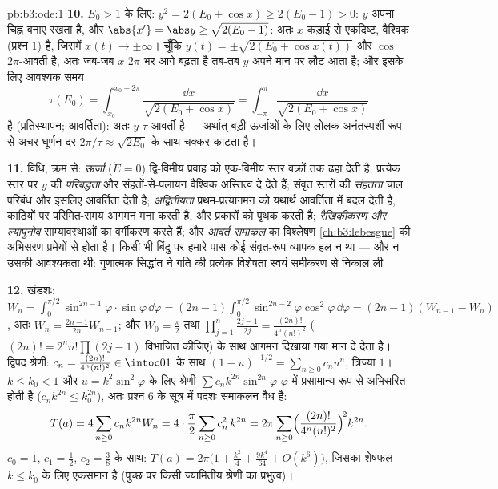 \begin{solution}{pb:b3:ode:1}
\textbf{10.} $E_0 > 1$ के लिए: $y^2 = 2(E_0 + \cos x) \geq
2(E_0 - 1) > 0$: $y$ अपना चिह्न बनाए रखता है, और
$\abs{x'} = \abs y
\geq \sqrt{2(E_0 - 1)}$: अतः $x$ कड़ाई से एकदिष्ट, वैश्विक (प्रश्न 1) है, जिसमें
$x(t) \to \pm\infty$। चूँकि $y(t) =
\pm\sqrt{2(E_0 + \cos x(t))}$ और $\cos$ $2\pi$-आवर्ती है, अतः जब-जब $x$ $2\pi$
भर आगे बढ़ता है तब-तब $y$ अपने मान पर लौट आता है; और इसके लिए
आवश्यक समय
\[
\tau(E_0) = \int_{x_0}^{x_0 + 2\pi}\frac{\dd
x}{\sqrt{2(E_0 + \cos x)}} =
\int_{-\pi}^{\pi}\frac{\dd x}{\sqrt{2(E_0 + \cos x)}}
\]
है (प्रतिस्थापन; आवर्तिता): अतः $y$ $\tau$-आवर्ती है --- अर्थात्
बड़ी ऊर्जाओं के लिए लोलक अनंतस्पर्शी रूप से अचर घूर्णन दर $2\pi/\tau \approx \sqrt{2E_0}$ के
साथ चक्कर काटता है।

\textbf{11.} विधि, क्रम से: \emph{ऊर्जा} ($\dot E =
0$) द्वि-विमीय प्रवाह
को एक-विमीय स्तर वक्रों तक ढहा देती है; प्रत्येक स्तर पर $y$ की
\emph{परिबद्धता} और संहतों-से-पलायन वैश्विक अस्तित्व दे देते हैं;
संवृत स्तरों की \emph{संहतता} चाल परिबंध और इसलिए आवर्तिता देती है;
\emph{अद्वितीयता} प्रथम-प्रत्यागमन को यथार्थ आवर्तिता में बदल देती
है, काठियों पर परिमित-समय आगमन मना करती है, और  प्रकारों को
पृथक करती है; \emph{रैखिकीकरण और ल्यापुनोव} साम्यावस्थाओं का वर्गीकरण
करते हैं; और \emph{आवर्त समाकल} का विश्लेषण \cref{ch:b3:lebesgue} की अभिसरण प्रमेयों
से होता है। किसी भी बिंदु पर हमारे पास कोई संवृत-रूप व्यापक हल न
था --- और न उसकी आवश्यकता थी: गुणात्मक सिद्धांत ने गति की प्रत्येक
विशेषता स्वयं समीकरण से निकाल ली।

\textbf{12.} खंडशः: $W_n = \int_0^{\pi/2}\sin^{2n-1}\varphi
\cdot\sin\varphi\,\dd\varphi = (2n-1)\int_0^{\pi/2}
\sin^{2n-2}\varphi\cos^2\varphi\,\dd\varphi = (2n-1)(W_{n-1}
- W_n)$, अतः $W_n = \frac{2n-1}{2n}W_{n-1}$; और $W_0 =
\frac\pi2$ तथा $\prod_{j=1}^n\frac{2j-1}{2j} =
\frac{(2n)!}{4^n(n!)^2}$ ($(2n)! = 2^nn!\prod(2j-1)$
विभाजित कीजिए) के साथ आगमन दिखाया गया मान दे देता है। द्विपद श्रेणी:
$c_n =
\frac{(2n)!}{4^n(n!)^2} \in \intoc01$ के साथ $(1 -
u)^{-1/2} = \sum_{n\geq0}c_nu^n$, त्रिज्या $1$। $k
\leq k_0 < 1$ और $u = k^2\sin^2\varphi$ के लिए श्रेणी
$\sum c_nk^{2n}\sin^{2n}\varphi$ $\varphi$ में प्रसामान्य रूप से अभिसरित होती है ($c_nk^{2n} \leq k_0^{2n}$), अतः प्रश्न
6 के सूत्र में पदशः समाकलन वैध है:
\[
T(a) = 4\sum_{n\geq0}c_nk^{2n}W_n
= 4\cdot\frac\pi2\sum_{n\geq0}c_n^2\,k^{2n}
= 2\pi\sum_{n\geq0}
\Bigl(\frac{(2n)!}{4^n(n!)^2}\Bigr)^{\!2}k^{2n} .
\]
$c_0 = 1$, $c_1 = \frac12$, $c_2 = \frac38$ के साथ: $T(a) =
2\pi\bigl(1 + \frac{k^2}4 + \frac{9k^4}{64} + O(k^6)\bigr)$, जिसका शेषफल $k \leq k_0$ के लिए एकसमान
है (पुच्छ पर किसी ज्यामितीय श्रेणी का प्रभुत्व)।


\end{solution}
